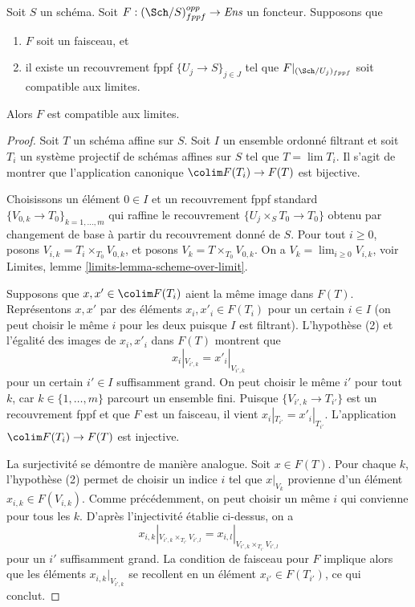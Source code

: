 \begin{lemma}
\label{lemma-sheaf-finite-presentation}
Soit $S$ un schéma.
Soit $F : (\Sch/S)_{fppf}^{opp} \to \textit{Ens}$ un foncteur.
Supposons que
\begin{enumerate}
\item $F$ soit un faisceau, et
\item il existe un recouvrement fppf $\{U_j \to S\}_{j \in J}$ tel que
$F|_{(\Sch/U_j)_{fppf}}$ soit compatible aux limites.
\end{enumerate}
Alors $F$ est compatible aux limites.
\end{lemma}

\begin{proof}
Soit $T$ un schéma affine sur $S$.
Soit $I$ un ensemble ordonné filtrant et soit
$T_i$ un système projectif de schémas affines sur $S$ tel que
$T = \lim T_i$. Il s'agit de montrer que l'application canonique
$\colim F(T_i) \to F(T)$ est bijective.

\medskip\noindent
Choisissons un élément $0 \in I$ et un recouvrement fppf standard
$\{V_{0, k} \to T_{0}\}_{k = 1, \ldots, m}$ qui raffine
le recouvrement $\{U_j \times_S T_0 \to T_0\}$ obtenu par changement de base à partir du recouvrement donné de $S$.
Pour tout $i \geq 0$, posons $V_{i, k} = T_i \times_{T_0} V_{0, k}$, et
posons $V_k = T \times_{T_0} V_{0, k}$. On a
$V_k = \lim_{i \geq 0} V_{i, k}$, voir
Limites, lemme \ref{limits-lemma-scheme-over-limit}.

\medskip\noindent
Supposons que $x, x' \in \colim F(T_i)$ aient la même image dans
$F(T)$. Représentons $x, x'$ par des éléments $x_i, x'_i \in F(T_i)$
pour un certain $i \in I$ (on peut choisir le même $i$ pour les deux puisque $I$ est filtrant).
L'hypothèse (2) et l'égalité des images de $x_i, x'_i$ dans
$F(T)$ montrent que
$$
x_i|_{V_{i', k}} = x'_i|_{V_{i', k}}
$$
pour un certain $i' \in I$ suffisamment grand. On peut choisir le même $i'$ pour tout
$k$, car $k \in \{1, \ldots, m\}$ parcourt un ensemble fini.
Puisque $\{V_{i', k} \to T_{i'}\}$
est un recouvrement fppf et que $F$ est un faisceau, il vient
$x_i|_{T_{i'}} = x'_i|_{T_{i'}}$. L'application
$\colim F(T_i) \to F(T)$ est injective.

\medskip\noindent
La surjectivité se démontre de manière analogue.
Soit $x \in F(T)$. Pour chaque $k$, l'hypothèse (2) permet de
choisir un indice $i$ tel que $x|_{V_k}$ provienne d'un
élément $x_{i, k} \in F(V_{i, k})$. Comme précédemment, on peut choisir un
même $i$ qui convienne pour tous les $k$. D'après l'injectivité
établie ci-dessus, on a
$$
x_{i, k}|_{V_{i', k} \times_{T_{i'}} V_{i', l}}
=
x_{i, l}|_{V_{i', k} \times_{T_{i'}} V_{i', l}}
$$
pour un $i'$ suffisamment grand. La condition de faisceau pour $F$ implique alors que
les éléments $x_{i, k}|_{V_{i', k}}$ se recollent en un élément $x_{i'} \in F(T_{i'})$,
ce qui conclut.
\end{proof}

